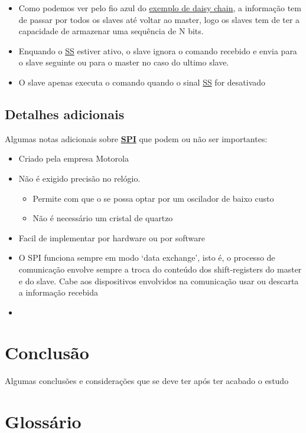 \documentclass[a4paper, 12pt, onecolumn, twoside]{article}
\begin{document}
\begin{itemize}
    \item Como podemos ver pelo fio azul do \hyperref[fig3]{exemplo de daisy chain}, a informação tem de passar
    por todos os slaves até voltar ao master, logo os slaves tem de ter a capacidade de armazenar uma sequência de N bits.
    \item Enquando o \hyperref[ss]{SS} estiver ativo, o slave ignora o comando recebido e envia para o slave seguinte ou para o master no caso do ultimo slave.
    \item O slave apenas executa o comando quando o sinal \hyperref[ss]{SS} for desativado
\end{itemize}




\subsection{Detalhes adicionais}
Algumas notas adicionais sobre \hyperref[spi]{\textbf{SPI}} que podem ou não ser importantes:

\begin{itemize}
    \item Criado pela empresa Motorola
    \item Não é exigido precisão no relógio. 
    \begin{itemize}
        \item Permite com que o se possa optar por um oscilador de baixo custo 
        \item Não é necessário um cristal de quartzo
    \end{itemize}
    \item Facil de implementar por hardware ou por software
    \item O SPI funciona sempre em modo `data exchange', isto é, o processo de comunicação 
    envolve sempre a troca do conteúdo dos shift-registers do master e do slave. 
    Cabe aos dispositivos envolvidos na comunicação usar ou descarta a informação recebida
    \item 
\end{itemize}

\section{Conclusão}
Algumas conclusões e considerações que se deve ter após
ter acabado o estudo

\clearpage
\section{Glossário}\label{glossary}
\end{document}

